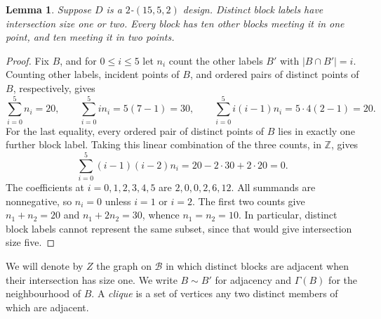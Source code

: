 \documentclass[11pt]{article}
\newcommand\cB{{\mathcal B}}
\newcommand\ints{{\mathbb Z}}
\newtheorem{lemma}[theorem]{Lemma}
\theoremstyle{definition}
\begin{document}
\begin{lemma}\label{lem:intersections}
\textup{\cite[Lemma 4.1, at $k=5$]{HC}}
Suppose $D$ is a $2$-$(15,5,2)$ design. Distinct block labels have
intersection size one or two. Every block has ten other blocks meeting
it in one point, and ten meeting it in two points.
\end{lemma}
\begin{proof}
Fix $B$, and for $0\le i\le5$ let $n_i$ count the other labels $B'$
with $|B\cap B'|=i$. Counting other labels, incident points of $B$, and
ordered pairs of distinct points of $B$, respectively, gives
\[
 \sum_{i=0}^5 n_i=20,\qquad
 \sum_{i=0}^5 i n_i=5(7-1)=30,\qquad
 \sum_{i=0}^5 i(i-1)n_i=5\cdot4(2-1)=20.
\]
For the last equality, every ordered pair of distinct points of $B$
lies in exactly one further block label. Taking this linear combination
of the three counts, in $\ints$, gives
\[
 \sum_{i=0}^5(i-1)(i-2)n_i=20-2\cdot30+2\cdot20=0.
\]
The coefficients at $i=0,1,2,3,4,5$ are $2,0,0,2,6,12$.
All summands are nonnegative, so $n_i=0$ unless $i=1$ or $i=2$.
The first two counts give $n_1+n_2=20$ and $n_1+2n_2=30$, whence
$n_1=n_2=10$. In particular, distinct block labels cannot represent
the same subset, since that would give intersection size five.
\end{proof}

We will denote by $Z$ the graph on $\cB$ in which distinct blocks are
adjacent when their intersection has size one. We write $B\sim B'$ for
adjacency and $\Gamma(B)$ for the neighbourhood of $B$. A \emph{clique}
is a set of vertices any two distinct members of which are adjacent.
\end{document}
